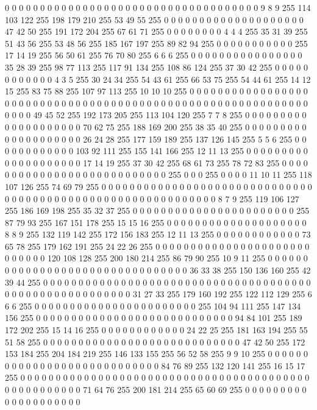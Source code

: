 0 0 0 0 0 0 0 0 0 0 0 0 0 0 0 0 0 0 0 0 0 0 0 0 0 0 0 0 0 0 0 0 0 0 0 0 9 8 9 255 114 103 122 255 198 179 210 255 53 49 55 255 0 0 0 0 0 0 0 0 0 0 0 0
0 0 0 0 0 0 0 0 47 42 50 255 191 172 204 255 67 61 71 255 0 0 0 0 0 0 0 0 4 4 4 255 35 31 39 255 51 43 56 255 53 48 56 255 185 167 197 255 89 82 94 255 0 0 0 0 0 0 0 0 0 0 0 255
17 14 19 255 56 50 61 255 76 70 80 255 6 6 6 255 0 0 0 0 0 0 0 0 0 0 0 0 0 0 0 0 35 28 39 255 98 77 113 255 117 91 134 255 108 86 124 255 37 30 42 255 0 0 0 0 0 0 0 0 0 0 0 0
4 3 5 255 30 24 34 255 54 43 61 255 66 53 75 255 54 44 61 255 14 12 15 255 83 75 88 255 107 97 113 255 10 10 10 255 0 0 0 0 0 0 0 0 0 0 0 0 0 0 0 0 0 0 0 0 0 0 0 0 0 0 0 0
0 0 0 0 0 0 0 0 0 0 0 0 0 0 0 0 0 0 0 0 0 0 0 0 0 0 0 0 0 0 0 0 0 0 0 0 49 45 52 255 192 173 205 255 113 104 120 255 7 7 8 255 0 0 0 0 0 0 0 0 0 0 0 0
0 0 0 0 0 0 0 0 70 62 75 255 188 169 200 255 38 35 40 255 0 0 0 0 0 0 0 0 0 0 0 0 0 0 0 0 0 0 0 0 26 24 28 255 177 159 189 255 137 126 145 255 5 5 6 255 0 0 0 0 0 0 0 0
0 0 0 0 103 92 111 255 155 141 166 255 12 11 13 255 0 0 0 0 0 0 0 0 0 0 0 0 0 0 0 0 0 0 0 0 17 14 19 255 37 30 42 255 68 61 73 255 78 72 83 255 0 0 0 0 0 0 0 0 0 0 0 0
0 0 0 0 0 0 0 0 0 0 0 0 0 0 0 255 0 0 0 255 0 0 0 0 11 10 11 255 118 107 126 255 74 69 79 255 0 0 0 0 0 0 0 0 0 0 0 0 0 0 0 0 0 0 0 0 0 0 0 0 0 0 0 0
0 0 0 0 0 0 0 0 0 0 0 0 0 0 0 0 0 0 0 0 0 0 0 0 0 0 0 0 0 0 0 0 8 7 9 255 119 106 127 255 186 169 198 255 35 32 37 255 0 0 0 0 0 0 0 0 0 0 0 0 0 0 0 0
0 0 0 0 0 0 0 255 87 79 93 255 167 151 178 255 15 15 16 255 0 0 0 0 0 0 0 0 0 0 0 0 0 0 0 0 0 0 0 0 8 8 9 255 132 119 142 255 172 156 183 255 12 11 13 255 0 0 0 0 0 0 0 0
0 0 0 0 73 65 78 255 179 162 191 255 24 22 26 255 0 0 0 0 0 0 0 0 0 0 0 0 0 0 0 0 0 0 0 0 0 0 0 0 0 0 0 0 120 108 128 255 200 180 214 255 86 79 90 255 10 9 11 255 0 0 0 0
0 0 0 0 0 0 0 0 0 0 0 0 0 0 0 0 0 0 0 0 0 0 0 0 0 0 0 0 36 33 38 255 150 136 160 255 42 39 44 255 0 0 0 0 0 0 0 0 0 0 0 0 0 0 0 0 0 0 0 0 0 0 0 0
0 0 0 0 0 0 0 0 0 0 0 0 0 0 0 0 0 0 0 0 0 0 0 0 0 0 0 0 0 0 0 0 31 27 33 255 179 160 192 255 122 112 129 255 6 6 6 255 0 0 0 0 0 0 0 0 0 0 0 0 0 0 0 0
0 0 0 0 0 0 0 255 104 94 111 255 147 134 156 255 0 0 0 0 0 0 0 0 0 0 0 0 0 0 0 0 0 0 0 0 0 0 0 0 0 0 0 0 94 84 101 255 189 172 202 255 15 14 16 255 0 0 0 0 0 0 0 0
0 0 0 0 24 22 25 255 181 163 194 255 55 51 58 255 0 0 0 0 0 0 0 0 0 0 0 0 0 0 0 0 0 0 0 0 0 0 0 0 0 0 0 0 47 42 50 255 172 153 184 255 204 184 219 255 146 133 155 255 56 52 58 255
9 9 10 255 0 0 0 0 0 0 0 0 0 0 0 0 0 0 0 0 0 0 0 0 0 0 0 0 0 0 0 0 84 76 89 255 132 120 141 255 16 15 17 255 0 0 0 0 0 0 0 0 0 0 0 0 0 0 0 0 0 0 0 0
0 0 0 0 0 0 0 0 0 0 0 0 0 0 0 0 0 0 0 0 0 0 0 0 0 0 0 0 0 0 0 0 71 64 76 255 200 181 214 255 65 60 69 255 0 0 0 0 0 0 0 0 0 0 0 0 0 0 0 0 0 0 0 0
